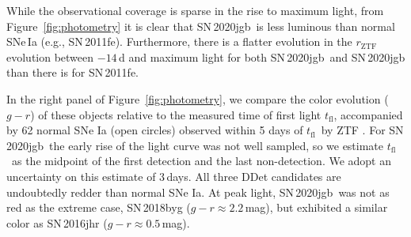 \documentclass[twocolumn]{aastex631}
\newcommand{\sn}{SN\,2020jgb}
\newcommand{\tfl}{$t_\mathrm{fl}$}
\begin{document}
While the observational coverage is sparse in the rise to maximum light, from Figure~\ref{fig:photometry} it is clear that \sn\ is less luminous than normal SNe\,Ia (e.g., SN\,2011fe). Furthermore, there is a flatter evolution in the $r_\mathrm{ZTF}$ evolution between $-14$\,d and maximum light for both \sn\ and SN\,2020jgb than there is for SN\,2011fe.  

In the right panel of Figure~\ref{fig:photometry}, we compare the color evolution ($g-r$) of these objects relative to the measured time of first light \tfl, accompanied by 62 normal SNe Ia (open circles) observed within 5 days of \tfl\ by ZTF \citep[from][]{Bulla2020}. For \sn\, the early rise of the light curve was not well sampled, so we estimate \tfl\ as the midpoint of the first detection and the last non-detection. We adopt an uncertainty on this estimate of 3\,days. 
All three DDet candidates are undoubtedly redder than normal SNe Ia. At peak light, \sn\ was not as red as the extreme case, SN\,2018byg ($g-r\approx2.2$\,mag), but exhibited a similar color as SN\,2016jhr ($g-r\approx0.5$\,mag).
\end{document}
